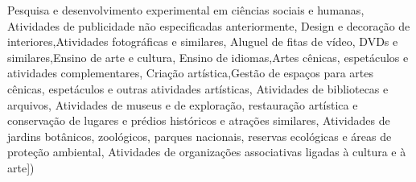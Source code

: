 \documentclass[
  12,
  dvipsnames]{article}
\newenvironment{Shaded}{\begin{snugshade}}{\end{snugshade}}
\newcommand{\NormalTok}[1]{#1}
\newcommand{\StringTok}[1]{\textcolor[rgb]{0.31,0.60,0.02}{#1}}
\begin{document}
\begin{Shaded}
\begin{Highlighting}[]
    \StringTok{\textquotesingle{}Pesquisa e desenvolvimento experimental em ciências sociais e humanas\textquotesingle{}}\NormalTok{,}
    \StringTok{\textquotesingle{}Atividades de publicidade não especificadas anteriormente\textquotesingle{}}\NormalTok{,}
    \StringTok{\textquotesingle{}Design e decoração de interiores\textquotesingle{}}\NormalTok{,}\StringTok{\textquotesingle{}Atividades fotográficas e similares\textquotesingle{}}\NormalTok{,}
    \StringTok{\textquotesingle{}Aluguel de fitas de vídeo, DVDs e similares\textquotesingle{}}\NormalTok{,}\StringTok{\textquotesingle{}Ensino de arte e cultura\textquotesingle{}}\NormalTok{,}
    \StringTok{\textquotesingle{}Ensino de idiomas\textquotesingle{}}\NormalTok{,}\StringTok{\textquotesingle{}Artes cênicas, espetáculos e atividades complementares\textquotesingle{}}\NormalTok{,}
    \StringTok{\textquotesingle{}Criação artística\textquotesingle{}}\NormalTok{,}\StringTok{\textquotesingle{}Gestão de espaços para artes cênicas, espetáculos e outras atividades artísticas\textquotesingle{}}\NormalTok{,}
    \StringTok{\textquotesingle{}Atividades de bibliotecas e arquivos\textquotesingle{}}\NormalTok{,}
    \StringTok{\textquotesingle{}Atividades de museus e de exploração, restauração artística e conservação de lugares e prédios históricos e atrações similares\textquotesingle{}}\NormalTok{,}
    \StringTok{\textquotesingle{}Atividades de jardins botânicos, zoológicos, parques nacionais, reservas ecológicas e áreas de proteção ambiental\textquotesingle{}}\NormalTok{,}
    \StringTok{\textquotesingle{}Atividades de organizações associativas ligadas à cultura e à arte\textquotesingle{}}\NormalTok{])}


\end{Highlighting}
\end{Shaded}
\end{document}
